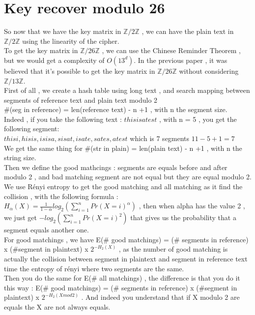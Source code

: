 \documentclass{article}
\begin{document}
\section{Key recover modulo 26}
So now that we have the key matrix in $\mathbb{Z}/2\mathbb{Z}$ , we can have the plain text in $\mathbb{Z}/2\mathbb{Z}$ using the linearity of the cipher.\\
To get the key matrix in $\mathbb{Z}/26\mathbb{Z}$ , we can use the Chinese Reminder Theorem , but we would get a complexity of $O(13^d)$. In the previous paper , it was believed that it's possible to get the key matrix in $\mathbb{Z}/26\mathbb{Z}$ without considering $\mathbb{Z}/13\mathbb{Z}$.\\
First of all , we create a hash table using long text , and search mapping between segments of reference text and plain text modulo 2\\
\#(seg in reference) = len(reference text) - n +1 , with n the segment size.\\
Indeed , if you take the following text : $thisisatest$ , with n = 5 , you get the following segment:\\
 $ thisi , hisis , isisa , sisat , isate , sates , atest $ which is 7 segments $ 11 - 5 + 1 = 7 $\\
We get the same thing for \#(str in plain) = len(plain text) - n +1 , with n the string size.\\
Then we define the good mathcings : segments are equals before and after modulo 2 , and bad matching segment are not equal but they are equal modulo 2.\\
We use Rényi entropy to get the good matching and all matching as it find the collision , with the following formula :\\
$H_{\alpha}(X) = \frac{1}{1-\alpha}log_{2}(\sum_{i=1}^{n}{Pr(X=i)^{\alpha}})$ , then when alpha has the value 2 , we just get $-log_{2}(\sum_{i=1}^{n}{Pr(X=i)^{2}})$ that gives us the probability that a segment equals another one.\\
For good matchings , we have E(\# good matchings) = (\# segments in reference) x (\#segment in plaintext) x $2^{-H_{2}(X)}$ , as the number of good matching is actually the collision between segment in plaintext and segment in reference text time the entropy of rényi where two segments are the same.\\
Then you do the same for  E(\# all matchings) , the difference is that you do it this way : E(\# good matchings) = (\# segments in reference) x (\#segment in plaintext) x $2^{-H_{2}(X mod 2)}$  . And indeed you understand that if X modulo 2 are equals the X are not always equals.\\
\end{document}
